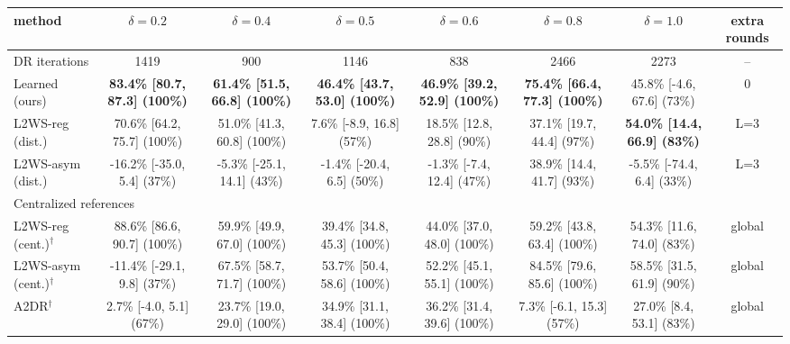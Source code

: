 
\begin{tabular}{lccccccc}
\toprule
method & $\delta=0.2$ & $\delta=0.4$ & $\delta=0.5$ & $\delta=0.6$ & $\delta=0.8$ & $\delta=1.0$ & extra rounds \\
\midrule
DR iterations & 1419 & 900 & 1146 & 838 & 2466 & 2273 & -- \\
\midrule
Learned (ours) & \textbf{83.4\% [80.7, 87.3] (100\%)} & \textbf{61.4\% [51.5, 66.8] (100\%)} & \textbf{46.4\% [43.7, 53.0] (100\%)} & \textbf{46.9\% [39.2, 52.9] (100\%)} & \textbf{75.4\% [66.4, 77.3] (100\%)} & 45.8\% [-4.6, 67.6] (73\%) & 0 \\
L2WS-reg (dist.) & 70.6\% [64.2, 75.7] (100\%) & 51.0\% [41.3, 60.8] (100\%) & 7.6\% [-8.9, 16.8] (57\%) & 18.5\% [12.8, 28.8] (90\%) & 37.1\% [19.7, 44.4] (97\%) & \textbf{54.0\% [14.4, 66.9] (83\%)} & L=3 \\
L2WS-asym (dist.) & -16.2\% [-35.0, 5.4] (37\%) & -5.3\% [-25.1, 14.1] (43\%) & -1.4\% [-20.4, 6.5] (50\%) & -1.3\% [-7.4, 12.4] (47\%) & 38.9\% [14.4, 41.7] (93\%) & -5.5\% [-74.4, 6.4] (33\%) & L=3 \\
\midrule
\multicolumn{8}{l}{Centralized references} \\
L2WS-reg (cent.)$^\dagger$ & 88.6\% [86.6, 90.7] (100\%) & 59.9\% [49.9, 67.0] (100\%) & 39.4\% [34.8, 45.3] (100\%) & 44.0\% [37.0, 48.0] (100\%) & 59.2\% [43.8, 63.4] (100\%) & 54.3\% [11.6, 74.0] (83\%) & global \\
L2WS-asym (cent.)$^\dagger$ & -11.4\% [-29.1, 9.8] (37\%) & 67.5\% [58.7, 71.7] (100\%) & 53.7\% [50.4, 58.6] (100\%) & 52.2\% [45.1, 55.1] (100\%) & 84.5\% [79.6, 85.6] (100\%) & 58.5\% [31.5, 61.9] (90\%) & global \\
A2DR$^\dagger$ & 2.7\% [-4.0, 5.1] (67\%) & 23.7\% [19.0, 29.0] (100\%) & 34.9\% [31.1, 38.4] (100\%) & 36.2\% [31.4, 39.6] (100\%) & 7.3\% [-6.1, 15.3] (57\%) & 27.0\% [8.4, 53.1] (83\%) & global \\
\bottomrule
\end{tabular}
